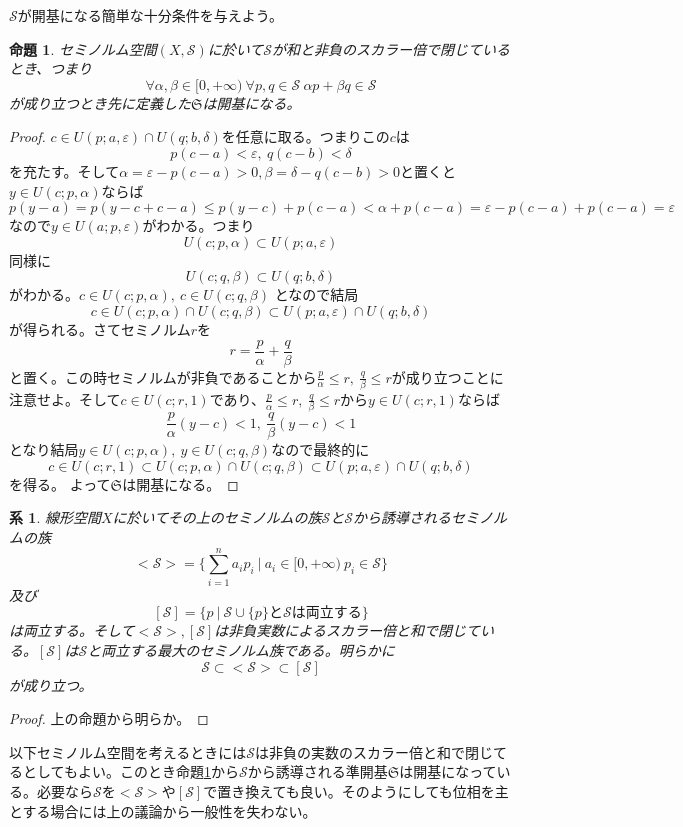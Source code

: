\documentclass[leqno]{jsarticle}
\newtheorem{prop}[thm]{命題}
\newtheorem{cor}[thm]{系}
\newcommand{\mgn}{\infty}
\newcommand{\dpst}{\displaystyle}
\newcommand{\ep}{\varepsilon}
\newcommand{\s}{\mathcal{S}}
\newcommand{\al}{\alpha}
\newcommand{\be}{\beta}
\newcommand{\de}{\delta}
\begin{document}
$\s$が開基になる簡単な十分条件を与えよう。
\setcounter{equation}{0}
\begin{prop}\label{kaiki}セミノルム空間$(X,\s)$に於いて$\s$が和と非負のスカラー倍で閉じているとき、つまり
\[
\forall \al,\be\in [0,+\mgn)\ \forall p,q\in \s\ \al p+\be q \in \s
\]
が成り立つとき先に定義した$\mathfrak{S}$は開基になる。
\end{prop}
\begin{proof}
$c\in U(p;a,\ep)\cap U(q;b,\de)$を任意に取る。つまりこの$c$は
\[
p(c-a)<\ep,\ q(c-b)<\de
\]
を充たす。そして$\al =\ep-p(c-a)>0,\be =\de-q(c-b)>0$と置くと$y\in U(c;p,\al)$ならば
\[
p(y-a)=p(y-c+c-a)\le p(y-c)+p(c-a)<\al+p(c-a)=\ep-p(c-a)+p(c-a)=\ep
\]
なので$y\in U(a;p,\ep)$がわかる。つまり
\[
U(c;p,\al)\subset U(p;a,\ep)
\]
同様に
\[
U(c;q,\be)\subset U(q;b,\de)
\]
がわかる。$c\in U(c;p,\al),\ c\in U(c;q,\be)$
となので結局
\[
c\in U(c;p,\al)\cap U(c;q,\be)\subset U(p;a,\ep)\cap U(q;b,\de)
\]
が得られる。さてセミノルム$r$を
\[
r=\frac{p}{\al}+\frac{q}{\be}
\]
と置く。この時セミノルムが非負であることから$\dpst \frac{p}{\al}\le r,\ \frac{q}{\be}\le r$が成り立つことに注意せよ。そして$c\in U(c;r,1)$であり、$\dpst \frac{p}{\al}\le r,\ \frac{q}{\be}\le r$から$y\in U(c;r,1)$ならば
\[
\frac{p}{\al}(y-c)<1,\ \frac{q}{\be}(y-c)<1
\]
となり結局$y\in U(c;p,\al),\ y\in U(c;q,\be)$なので最終的に
\[
c\in U(c;r,1)\subset U(c;p,\al)\cap U(c;q,\be)\subset U(p;a,\ep)\cap U(q;b,\de)
\]
を得る。
よって$\mathfrak{S}$は開基になる。
\end{proof}


\begin{cor}
線形空間$X$に於いてその上のセミノルムの族$\s$と$\s$から誘導されるセミノルムの族
\[
<\s>=\{\sum_{i=1}^na_i p_i\ |\ a_i \in[0,+\mgn)\ p_i\in \s\}
\]
及び
\[
[\s]=\{p\ |\ \s\cup \{p\}と\s は両立する\}
\]
は両立する。そして$<\s>,[\s]$は非負実数によるスカラー倍と和で閉じている。$[\s]$は$\s$と両立する最大のセミノルム族である。明らかに
\[
\s\subset <\s>\subset [\s]
\]
が成り立つ。
\end{cor}
\begin{proof}
上の命題から明らか。
\end{proof}


以下セミノルム空間を考えるときには$\s$は非負の実数のスカラー倍と和で閉じてるとしてもよい。このとき命題\ref{kaiki}から$\s$から誘導される準開基$\mathfrak{S}$は開基になっている。必要なら$\s$を$<\s>$や$[\s]$で置き換えても良い。そのようにしても位相を主とする場合には上の議論から一般性を失わない。
\end{document}
